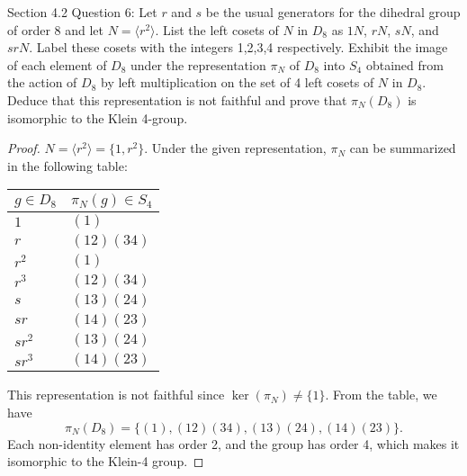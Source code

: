 Section 4.2 Question 6:
Let $r$ and $s$ be the usual generators for the dihedral group of order 8
and let $N=\langle r^2\rangle$. List the left cosets of $N$ in $D_8$ as
$1N$, $rN$, $sN$, and $srN$. Label these cosets with the integers 1,2,3,4
respectively. Exhibit the image of each element of $D_8$ under the
representation $\pi_N$ of $D_8$ into $S_4$ obtained from the action of
$D_8$ by left multiplication on the set of 4 left cosets of $N$ in $D_8$.
Deduce that this representation is not faithful and prove that $\pi_N(D_8)$
is isomorphic to the Klein 4-group.

\begin{proof}
  $N=\langle r^2\rangle=\{1,r^2\}$. Under the given representation, $\pi_N$
  can be summarized in the following table:
  \begin{center}
    \begin{tabular}{|l|l|}
      \hline
      $g\in D_8$ & $\pi_N(g)\in S_4$ \\
      \hline\hline
      $1$     & $(1)$ \\
      $r$     & $(12)(34)$ \\
      $r^2$   & $(1)$ \\
      $r^3$   & $(12)(34)$ \\
      $s$     & $(13)(24)$ \\
      $sr$    & $(14)(23)$ \\
      $sr^2$  & $(13)(24)$ \\
      $sr^3$  & $(14)(23)$ \\
      \hline
    \end{tabular}
  \end{center}
  This representation is not faithful since $\ker(\pi_N)\neq\{1\}$.
  From the table, we have
  \begin{equation*}
    \pi_N(D_8)=\{(1),(12)(34),(13)(24),(14)(23)\}.
  \end{equation*}
  Each non-identity element has order 2, and the group has order 4, which
  makes it isomorphic to the Klein-4 group.
\end{proof}
